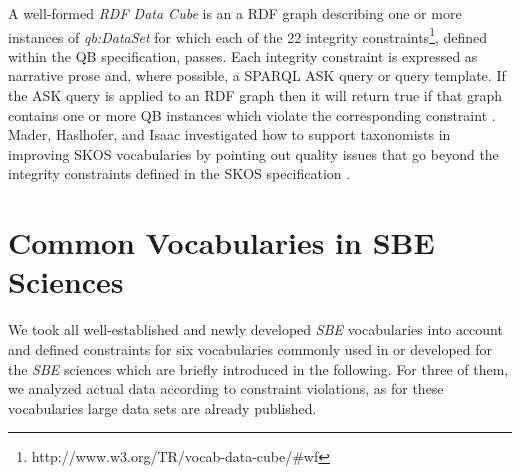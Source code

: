 \documentclass[conference]{IEEEtran}
\begin{document}

A well-formed \emph{RDF Data Cube} is an a RDF graph describing one or more instances of \emph{qb:DataSet} for which each of the 22 integrity constraints\footnote{http://www.w3.org/TR/vocab-data-cube/\#wf}, defined within the QB specification, passes.
Each integrity constraint is expressed as narrative prose and, where possible, a SPARQL ASK query or query template. 
If the ASK query is applied to an RDF graph then it will return true if that graph contains one or more QB instances which violate the corresponding constraint \cite{CyganiakReynolds2014}.
Mader, Haslhofer, and Isaac investigated how to support
taxonomists in improving SKOS vocabularies by pointing out quality
issues that go beyond the integrity constraints defined in the SKOS specification \cite{MaderHaslhoferIsaac2012}.
 
\section{Common Vocabularies in SBE Sciences}
\label{rdf-representation}


We took all well-established and newly developed \emph{SBE} vocabularies into account and defined constraints for six vocabularies commonly used in or developed for the \emph{SBE} sciences which are briefly introduced in the following.
For three of them, we analyzed actual data according to constraint violations, as for these vocabularies large data sets are already published.

\end{document}
